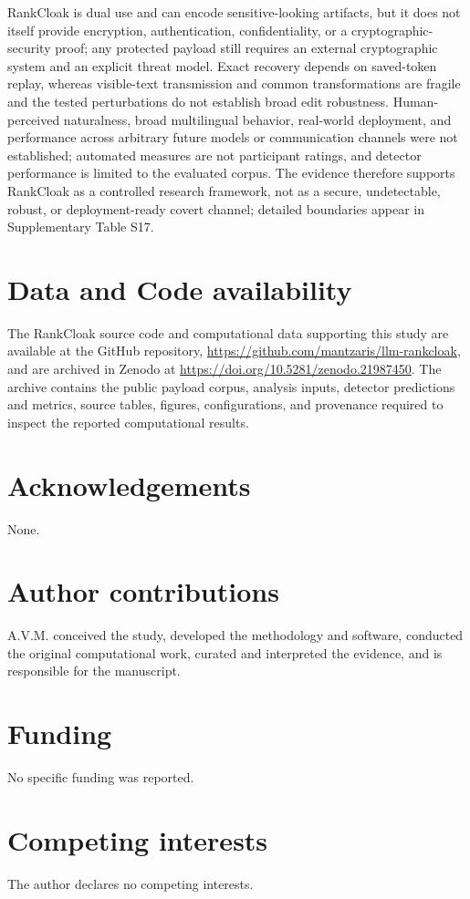 \documentclass[fleqn,10pt]{wlscirep}
\begin{document}
RankCloak is dual use and can encode sensitive-looking artifacts, but it does not itself provide encryption, authentication, confidentiality, or a cryptographic-security proof; any protected payload still requires an external cryptographic system and an explicit threat model. Exact recovery depends on saved-token replay, whereas visible-text transmission and common transformations are fragile and the tested perturbations do not establish broad edit robustness. Human-perceived naturalness, broad multilingual behavior, real-world deployment, and performance across arbitrary future models or communication channels were not established; automated measures are not participant ratings, and detector performance is limited to the evaluated corpus. The evidence therefore supports RankCloak as a controlled research framework, not as a secure, undetectable, robust, or deployment-ready covert channel; detailed boundaries appear in Supplementary Table S17.

\section*{Data and Code availability}\label{sec:data-code}

The RankCloak source code and computational data supporting this study are available at the GitHub repository, \url{https://github.com/mantzaris/llm-rankcloak}, and are archived in Zenodo at \url{https://doi.org/10.5281/zenodo.21987450}. The archive contains the public payload corpus, analysis inputs, detector predictions and metrics, source tables, figures, configurations, and provenance required to inspect the reported computational results.



\section*{Acknowledgements}

None.

\section*{Author contributions}

A.V.M. conceived the study, developed the methodology and software, conducted the original computational work, curated and interpreted the evidence, and is responsible for the manuscript.

\section*{Funding}

No specific funding was reported.

\section*{Competing interests}

The author declares no competing interests.
\end{document}
